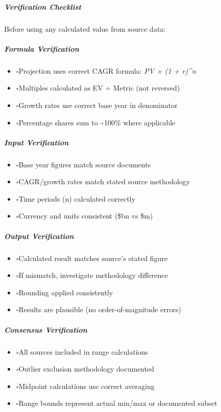 \documentclass[11pt]{article}
\newcommand{\UncheckedBox}{$\square$}
\begin{document}
\subparagraph{Verification Checklist}\mbox{}\par

Before using any calculated value from source data:


\subparagraph{Formula Verification}\mbox{}\par
\begin{itemize}[leftmargin=*,itemsep=2pt,topsep=2pt]
\item {} \UncheckedBox Projection uses correct CAGR formula: \emph{PV × (1 + r)\textasciicircum{}n}
\item {} \UncheckedBox Multiples calculated as EV ÷ Metric (not reversed)
\item {} \UncheckedBox Growth rates use correct base year in denominator
\item {} \UncheckedBox Percentage shares sum to \textasciitilde{}100\% where applicable
\end{itemize}

\subparagraph{Input Verification}\mbox{}\par
\begin{itemize}[leftmargin=*,itemsep=2pt,topsep=2pt]
\item {} \UncheckedBox Base year figures match source documents
\item {} \UncheckedBox CAGR/growth rates match stated source methodology
\item {} \UncheckedBox Time periods (n) calculated correctly
\item {} \UncheckedBox Currency and units consistent (\$bn vs \$m)
\end{itemize}

\subparagraph{Output Verification}\mbox{}\par
\begin{itemize}[leftmargin=*,itemsep=2pt,topsep=2pt]
\item {} \UncheckedBox Calculated result matches source's stated figure
\item {} \UncheckedBox If mismatch, investigate methodology difference
\item {} \UncheckedBox Rounding applied consistently
\item {} \UncheckedBox Results are plausible (no order-of-magnitude errors)
\end{itemize}

\subparagraph{Consensus Verification}\mbox{}\par
\begin{itemize}[leftmargin=*,itemsep=2pt,topsep=2pt]
\item {} \UncheckedBox All sources included in range calculations
\item {} \UncheckedBox Outlier exclusion methodology documented
\item {} \UncheckedBox Midpoint calculations use correct averaging
\item {} \UncheckedBox Range bounds represent actual min/max or documented subset
\end{itemize}
\end{document}
